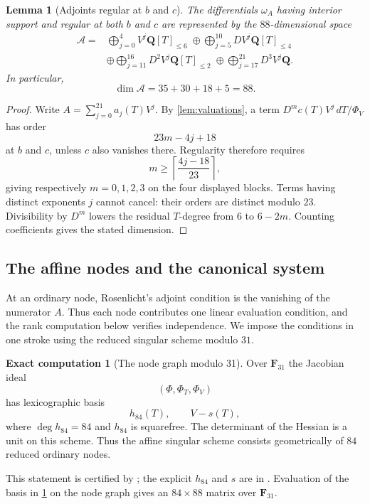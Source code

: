 \documentclass[11pt]{amsart}
\newtheorem{lemma}[lemma]{Lemma}
\theoremstyle{definition}
\newtheorem{computation}[computation]{Exact computation}
\theoremstyle{remark}
\newcommand{\QQ}{\mathbf Q}
\newcommand{\FF}{\mathbf F}
\begin{document}
\begin{lemma}[Adjoints regular at $b$ and $c$]\label{lem:adjoint-space}
The differentials $\omega_A$ having interior support and regular at both
$b$ and $c$ are represented by the $88$-dimensional space
\begin{align*}
\mathcal A={}&
 \bigoplus_{j=0}^{4} V^j\QQ[T]_{\leq6}
 \;\oplus\!
 \bigoplus_{j=5}^{10} DV^j\QQ[T]_{\leq4}\\
&\oplus\!
 \bigoplus_{j=11}^{16}D^2V^j\QQ[T]_{\leq2}
 \;\oplus\!
 \bigoplus_{j=17}^{21}D^3V^j\QQ.
\end{align*}
In particular,
\[
 \dim\mathcal A=35+30+18+5=88.
\]
\end{lemma}

\begin{proof}
Write $A=\sum_{j=0}^{21}a_j(T)V^j$.  By
\cref{lem:valuations}, a term $D^m c(T)V^j\,dT/\Phi_V$ has order
\[
 23m-4j+18
\]
at $b$ and $c$, unless $c$ also vanishes there.  Regularity therefore
requires
\[
 m\geq\left\lceil\frac{4j-18}{23}\right\rceil,
\]
giving respectively $m=0,1,2,3$ on the four displayed blocks.  Terms having
distinct exponents $j$ cannot cancel: their orders are distinct modulo $23$.
Divisibility by $D^m$ lowers the residual $T$-degree from $6$ to $6-2m$.
Counting coefficients gives the stated dimension.
\end{proof}

\subsection{The affine nodes and the canonical system}

At an ordinary node, Rosenlicht's adjoint condition \cite{Rosenlicht} is the
vanishing of the numerator $A$.  Thus each node contributes one linear
evaluation condition, and the rank computation below verifies independence.
We impose the conditions in one stroke using the reduced singular scheme
modulo $31$.

\begin{computation}[The node graph modulo 31]\label{comp:nodes}
Over $\FF_{31}$ the Jacobian ideal
\[
 (\Phi,\Phi_T,\Phi_V)
\]
has lexicographic basis
\[
 h_{84}(T),\qquad V-s(T),
\]
where $\deg h_{84}=84$ and $h_{84}$ is squarefree.  The determinant of the
Hessian is a unit on this scheme.  Thus the affine singular scheme consists
geometrically of $84$ reduced ordinary nodes.
\end{computation}

This statement is certified by
; the explicit $h_{84}$ and
$s$ are in .  Evaluation of the basis in
\cref{lem:adjoint-space} on the node graph gives an $84\times88$ matrix over
$\FF_{31}$.
\end{document}
